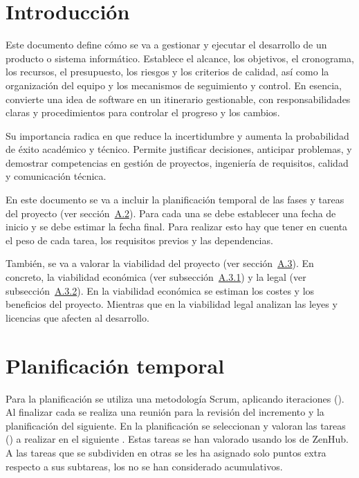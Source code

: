 
\section{Introducción}
Este documento define cómo se va a gestionar y ejecutar el desarrollo de un producto o sistema informático. Establece el alcance, los objetivos, el cronograma, los recursos, el presupuesto, los riesgos y los criterios de calidad, así como la organización del equipo y los mecanismos de seguimiento y control. En esencia, convierte una idea de software en un itinerario gestionable, con responsabilidades claras y procedimientos para controlar el progreso y los cambios.

Su importancia radica en que reduce la incertidumbre y aumenta la probabilidad de éxito académico y técnico. Permite justificar decisiones, anticipar problemas, y demostrar competencias en gestión de proyectos, ingeniería de requisitos, calidad y comunicación técnica.

En este documento se va a incluir la planificación temporal de las fases y tareas del proyecto (ver sección~\hyperref[plan:temp]{A.2}). Para cada una se debe establecer una fecha de inicio y se debe estimar la fecha final. Para realizar esto hay que tener en cuenta el peso de cada tarea, los requisitos previos y las dependencias.

También, se va a valorar la viabilidad del proyecto (ver sección~\hyperref[plan:viab]{A.3}). En concreto, la viabilidad económica (ver subsección~\hyperref[viabilidad_economica]{A.3.1}) y la legal (ver subsección~\hyperref[viabilidad_legal]{A.3.2}). En la viabilidad económica se estiman los costes y los beneficios del proyecto. Mientras que en la viabilidad legal analizan las leyes y licencias que afecten al desarrollo.  

\section{Planificación temporal} \label{plan:temp}
Para la planificación se utiliza una metodología Scrum, aplicando iteraciones (). Al finalizar cada  se realiza una reunión para la revisión del incremento y la planificación del siguiente. En la planificación se seleccionan y valoran las tareas () a realizar en el siguiente . Estas tareas se han valorado usando los  de ZenHub. A las tareas que se subdividen en otras se les ha asignado solo puntos extra respecto a sus subtareas, los  no se han considerado acumulativos.


